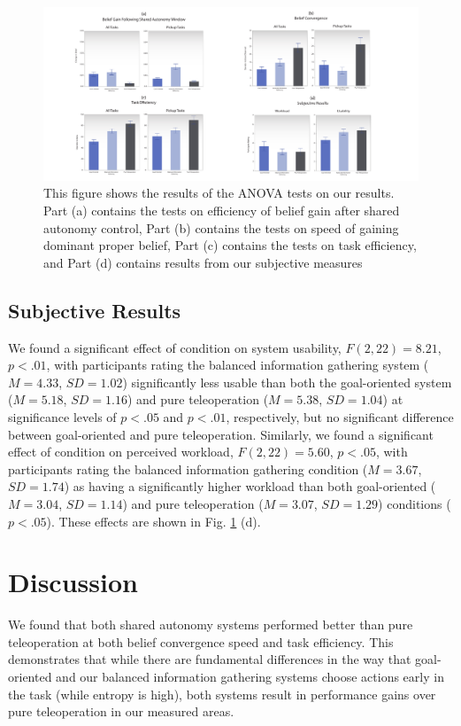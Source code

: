 \documentclass[conference]{IEEEtran}
\begin{document}
\begin{figure}
\includegraphics[width=\textwidth]{figures/All_Measures.pdf}
\caption{This figure shows the results of the ANOVA tests on our results. Part (a) contains the tests on efficiency of belief gain after shared autonomy control, Part (b) contains the tests on speed of gaining dominant proper belief, Part (c) contains the tests on task efficiency, and Part (d) contains results from our subjective measures}
\label{picture_results}
\end{figure}

\subsection{Subjective Results}

We found a significant effect of condition on system usability, $F(2, 22) = 8.21$, $p < .01$, with participants rating the balanced information gathering system ($M = 4.33$, $SD = 1.02$) significantly less usable than both the goal-oriented system ($M = 5.18$, $SD = 1.16$) and pure teleoperation ($M = 5.38$, $SD = 1.04$) at significance levels of $p < .05$ and $p < .01$, respectively, but no significant difference between goal-oriented and pure teleoperation. Similarly, we found a significant effect of condition on perceived workload, $F(2, 22) = 5.60$, $p < .05$, with participants rating the balanced information gathering condition ($M = 3.67$, $SD = 1.74$) as having a significantly higher workload than both goal-oriented ($M = 3.04$, $SD = 1.14$) and pure teleoperation ($M = 3.07$, $SD = 1.29$) conditions ($p < .05$). These effects are shown in Fig. \ref{picture_results} (d).

\section{Discussion}
We found that both shared autonomy systems performed better than pure teleoperation at both belief convergence speed and task efficiency. This demonstrates that while there are fundamental differences in the way that goal-oriented and our balanced information gathering systems choose actions early in the task (while entropy is high), both systems result in performance gains over pure teleoperation in our measured areas.
\end{document}
